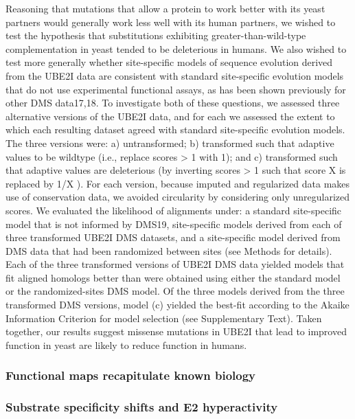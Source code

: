 Reasoning that mutations that allow a protein to work better with its yeast partners would generally work less well with its human partners, we wished to test the hypothesis that substitutions exhibiting greater-than-wild-type complementation in yeast tended to be deleterious in humans. We also wished to test more generally whether site-specific models of sequence evolution derived from the UBE2I data are consistent with standard site-specific evolution models that do not use experimental functional assays, as has been shown previously for other DMS data17,18. To investigate both of these questions, we assessed three alternative versions of the UBE2I data, and for each we assessed the extent to which each resulting dataset agreed with standard site-specific evolution models.  The three versions were: a) untransformed;  b) transformed such that adaptive values to be wildtype (i.e.,  replace scores > 1 with 1); and c) transformed such that adaptive values are deleterious (by inverting scores > 1 such that score X is replaced by 1/X ).  For each version, because imputed and regularized data makes use of conservation data, we avoided circularity by considering only unregularized scores.  We evaluated the likelihood of alignments under: a standard site-specific model that is not informed by DMS19, site-specific models derived from each of three transformed UBE2I DMS datasets, and a site-specific model derived from DMS data that had been randomized between sites (see Methods for details).  Each of the three transformed versions of UBE2I DMS data yielded models that fit aligned homologs better than were obtained using either the standard model or the randomized-sites DMS model.  Of the three models derived from the three transformed DMS versions, model (c) yielded the best-fit according to the Akaike Information Criterion for model selection (see Supplementary Text).  Taken together, our results suggest missense mutations in UBE2I that lead to improved function in yeast are likely to reduce function in humans.


\subsubsection{Functional maps recapitulate known biology}

\subsubsection{Substrate specificity shifts and E2 hyperactivity}

